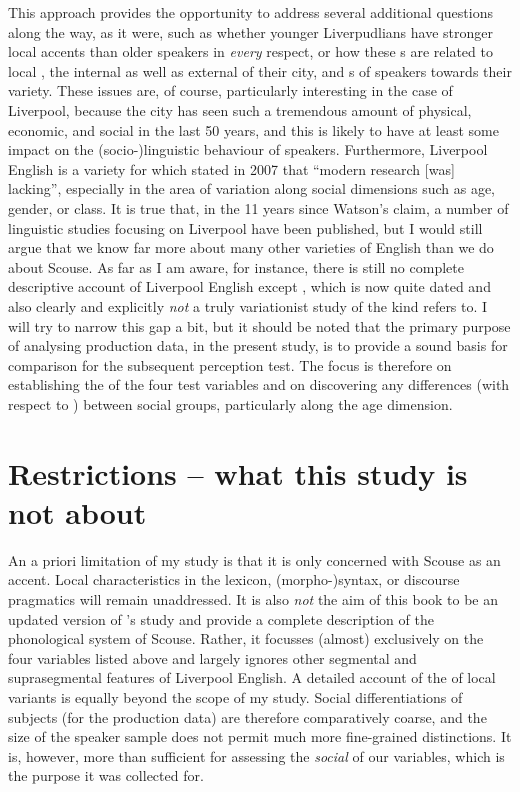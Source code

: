 This approach provides the opportunity to address several additional questions along the way, as it were, such as whether younger Liverpudlians have stronger local accents than older speakers in \emph{every} respect, or how these s are related to local , the internal as well as external  of their city, and s of speakers towards their variety.
These issues are, of course, particularly interesting in the case of Liverpool, because the city has seen such a tremendous amount of physical, economic, and social  in the last 50 years, and this is likely to have at least some impact on the (socio-)linguistic behaviour of speakers.
Furthermore, Liverpool English is a variety for which \textcite[351]{watson2007} stated in 2007 that ``modern research [was] lacking'', especially in the area of variation along social dimensions such as age, gender, or class.
It is true that, in the 11 years since Watson's claim, a number of linguistic studies focusing on Liverpool have been published, but I would still argue that we know far more about many other varieties of English than we do about Scouse.
As far as I am aware, for instance, there is still no complete descriptive account of Liverpool English except \cite{knowles1973}, which is now quite dated and also clearly and explicitly \emph{not} a truly variationist study of the kind \textcite{watson2007} refers to.
I will try to narrow this gap a bit, but it should be noted that the primary purpose of analysing production data, in the present study, is to provide a sound basis for comparison for the subsequent perception test.
The focus is therefore on establishing the  of the four test variables and on discovering any differences (with respect to ) between social groups, particularly along the age dimension.

\section{Restrictions -- what this study is not about}
\label{sec.intro.restrict}

An a priori limitation of my study is that it is only concerned with Scouse as an accent.
Local characteristics in the lexicon, (morpho-)syntax, or discourse pragmatics will remain unaddressed.
It is also \emph{not} the aim of this book to be an updated version of \citeauthor{knowles1973}'s \citeyear{knowles1973} study and provide a complete description of the phonological system of Scouse.
Rather, it focusses (almost) exclusively on the four variables listed above and largely ignores other segmental and suprasegmental features of Liverpool English.
A detailed account of the  of local variants is equally beyond the scope of my study.
Social differentiations of subjects (for the production data) are therefore comparatively coarse, and the size of the speaker sample does not permit much more fine-grained distinctions.
It is, however, more than sufficient for assessing the \emph{social } of our variables, which is the purpose it was collected for.

